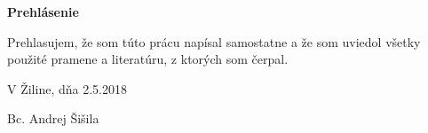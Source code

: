 \centerline{\bf Prehlásenie}

\vspace{2em}

\noindent
Prehlasujem, že som túto prácu napísal samostatne a že som uviedol 
všetky použité pramene a literatúru, z ktorých som čerpal. 

\vspace{2em}

\noindent

V Žiline, dňa 2.5.2018

\hfill

Bc. Andrej Šišila